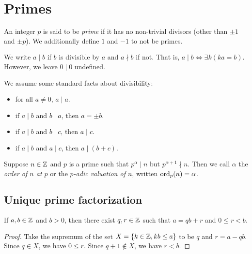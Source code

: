 \section{Primes} \label{sec:nt:primes}
\begin{definition*}[Prime] \label{def:prime}
    An integer $p$ is said to be \emph{prime} if it has no non-trivial
    divisors (other than $\pm 1$ and $\pm p$).
    We additionally define $1$ and $-1$ to not be primes.
\end{definition*}
\begin{notation}
    We write $a \mid b$ if $b$ is divisible by $a$ and $a \nmid b$ if not.
    That is, $a \mid b \iff \exists k (ka = b)$.
    However, we leave $0 \mid 0$ undefined.
\end{notation}
We assume some standard facts about divisibility:
\begin{itemize}
    \item for all $a \ne 0$, $a \mid a$.
    \item if $a \mid b$ and $b \mid a$, then $a = \pm b$.
    \item if $a \mid b$ and $b \mid c$, then $a \mid c$.
    \item if $a \mid b$ and $a \mid c$, then $a \mid (b + c)$.
\end{itemize}
\begin{definition*} \label{def:prime_order}
    Suppose $n \in \mathbb{Z}$ and $p$ is a prime such that $p^\alpha \mid n$ but
    $p^{\alpha + 1} \nmid n$.
    Then we call $\alpha$ the \emph{order of $n$ at $p$} or the
    \emph{$p$-adic valuation of $n$}, written $\operatorname{ord}_p(n) = \alpha$.
\end{definition*}

\subsection{Unique prime factorization} \label{sec:nt:ftoa}
\begin{lemma*}
    If $a, b \in \mathbb{Z}$ and $b > 0$, then there exist $q, r \in \mathbb{Z}$ such that
    $a = qb + r$ and $0 \le r < b$.
\end{lemma*}
\begin{proof}
    Take the supremum of the set $X = \set{k \in \Z, kb \le a}$ to be $q$
    and $r = a - qb$.
    Since $q \in X$, we have $0 \le r$.
    Since $q + 1 \notin X$, we have $r < b$.
\end{proof}

